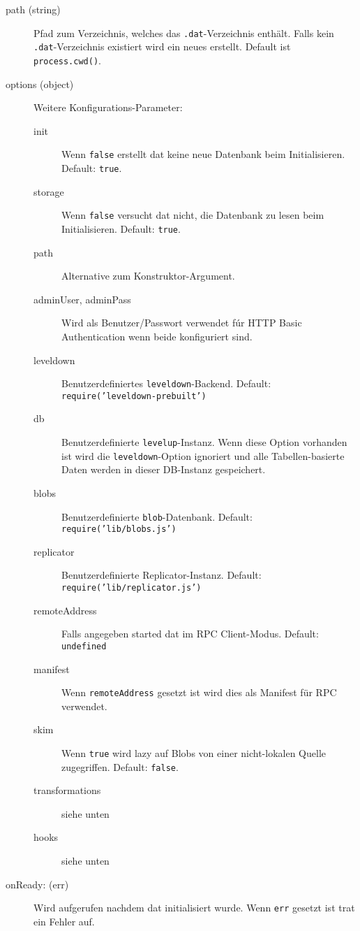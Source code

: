 \begin{description}
\item[path (string)] Pfad zum Verzeichnis, welches das \texttt{.dat}-Verzeichnis enthält. Falls kein \texttt{.dat}-Verzeichnis existiert wird ein neues erstellt. Default ist \texttt{process.cwd()}.
\item[options (object)] Weitere Konfigurations-Parameter:
    \begin{description}
    \item[init] Wenn \texttt{false} erstellt dat keine neue Datenbank beim Initialisieren. Default: \texttt{true}.
    \item[storage] Wenn \texttt{false} versucht dat nicht, die Datenbank zu lesen beim Initialisieren. Default: \texttt{true}.
    \item[path] Alternative zum Konstruktor-Argument.
    \item[adminUser, adminPass] Wird als Benutzer/Passwort verwendet fúr HTTP Basic Authentication wenn beide konfiguriert sind.
    \item[leveldown] Benutzerdefiniertes \texttt{leveldown}-Backend. Default: \texttt{require('leveldown-prebuilt')}
    \item[db] Benutzerdefinierte \texttt{levelup}-Instanz. Wenn diese Option vorhanden ist wird die \texttt{leveldown}-Option ignoriert und alle Tabellen-basierte Daten werden in dieser DB-Instanz gespeichert.
    \item[blobs] Benutzerdefinierte \texttt{blob}-Datenbank. Default: \texttt{require('lib/blobs.js')}
    \item[replicator] Benutzerdefinierte Replicator-Instanz. Default: \texttt{require('lib/replicator.js')}
    \item[remoteAddress] Falls angegeben started dat im RPC Client-Modus. Default: \texttt{undefined}
    \item[manifest] Wenn \texttt{remoteAddress} gesetzt ist wird dies als Manifest für RPC verwendet.
    \item[skim] Wenn \texttt{true} wird lazy auf Blobs von einer nicht-lokalen Quelle zugegriffen. Default: \texttt{false}.
    \item[transformations] siehe unten
    \item[hooks] siehe unten
    \end{description}
\item[onReady: (err)] Wird aufgerufen nachdem dat initialisiert wurde. Wenn \texttt{err} gesetzt ist trat ein Fehler auf.
\end{description}

